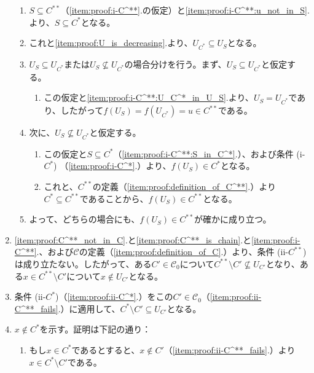 ﻿\documentclass{ltjsarticle}
\theoremstyle{definition}
\begin{document}
\begin{enumerate}
\begin{enumerate}
        \item \label{item:proof:i-C^**:S_in_C^*} $S \subseteq C^{**}$（\ref{item:proof:i-C^**}.の仮定）と\ref{item:proof:i-C^**:u_not_in_S}.より、$S \subseteq C^*$となる。
        \item \label{item:proof:i-C^**:U_C^*_in_U_S} これと\ref{item:proof:U_is_decreasing}.より、$U_{C^*} \subseteq U_S$となる。
        \item $U_S \subseteq U_{C^*}$または$U_S \not\subseteq U_{C^*}$の場合分けを行う。まず、$U_S \subseteq U_{C^*}$と仮定する。
        \begin{enumerate}
            \item この仮定と\ref{item:proof:i-C^**:U_C^*_in_U_S}.より、$U_S = U_{C^*}$であり、したがって$f(U_S) = f(U_{C^*}) = u \in C^{**}$である。
        \end{enumerate}
        \item 次に、$U_S \not\subseteq U_{C^*}$と仮定する。
        \begin{enumerate}
            \item この仮定と$S \subseteq C^*$（\ref{item:proof:i-C^**:S_in_C^*}.）、および条件 (i-$C^*$) （\ref{item:proof:i-C^*}.）より、$f(U_S) \in C^*$となる。
            \item これと、$C^{**}$の定義（\ref{item:proof:definition_of_C^**}.）より$C^* \subseteq C^{**}$であることから、$f(U_S) \in C^{**}$となる。
        \end{enumerate}
        \item よって、どちらの場合にも、$f(U_S) \in C^{**}$が確かに成り立つ。
    \end{enumerate}
    \item \label{item:proof:ii-C^**_fails} \ref{item:proof:C^**_not_in_C}.と\ref{item:proof:C^**_is_chain}.と\ref{item:proof:i-C^**}.、および$\mathcal{C}$の定義（\ref{item:proof:definition_of_C}.）より、条件 (ii-$C^{**}$) は成り立たない。したがって、ある$C' \in \mathcal{C}_0$について$C^{**} \setminus C' \not\subseteq U_{C'}$となり、ある$x \in C^{**} \setminus C'$について$x \not\in U_{C'}$となる。
    \item \label{item:proof:C^*_minus_C'_in_U_C'} 条件 (ii-$C^*$)（\ref{item:proof:ii-C^*}.）をこの$C' \in \mathcal{C}_0$（\ref{item:proof:ii-C^**_fails}.）に適用して、$C^* \setminus C' \subseteq U_{C'}$となる。
    \item \label{item:proof:x_not_in_C^*} $x \not\in C^*$を示す。証明は下記の通り：
    \begin{enumerate}
        \item もし$x \in C^*$であるとすると、$x \not\in C'$（\ref{item:proof:ii-C^**_fails}.）より$x \in C^* \setminus C'$である。

\end{enumerate}
\end{enumerate}
\end{document}
